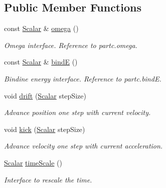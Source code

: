 \subsection*{Public Member Functions}
\begin{DoxyCompactItemize}
\item 
const \mbox{\hyperlink{class_space_h_1_1_regu_system_a6f6c4d4fd030a85621a78b137c0ac889}{Scalar}} \& \mbox{\hyperlink{class_space_h_1_1_regu_system_a94017190fb2ab31159e27fcbfd105c7b}{omega}} ()
\begin{DoxyCompactList}\small\item\em Omega interface. Reference to partc.\+omega. \end{DoxyCompactList}\item 
const \mbox{\hyperlink{class_space_h_1_1_regu_system_a6f6c4d4fd030a85621a78b137c0ac889}{Scalar}} \& \mbox{\hyperlink{class_space_h_1_1_regu_system_a86d3f6978e184f6cdd91a70eda2b5789}{bindE}} ()
\begin{DoxyCompactList}\small\item\em Bindine energy interface. Reference to partc.\+bindE. \end{DoxyCompactList}\item 
void \mbox{\hyperlink{class_space_h_1_1_regu_system_a96230f1b7cda19c0605e1148252ec7ae}{drift}} (\mbox{\hyperlink{class_space_h_1_1_regu_system_a6f6c4d4fd030a85621a78b137c0ac889}{Scalar}} step\+Size)
\begin{DoxyCompactList}\small\item\em Advance position one step with current velocity. \end{DoxyCompactList}\item 
void \mbox{\hyperlink{class_space_h_1_1_regu_system_a6f395fb438f86a8da6fbd1c7c8903cc4}{kick}} (\mbox{\hyperlink{class_space_h_1_1_regu_system_a6f6c4d4fd030a85621a78b137c0ac889}{Scalar}} step\+Size)
\begin{DoxyCompactList}\small\item\em Advance velocity one step with current acceleration. \end{DoxyCompactList}\item 
\mbox{\hyperlink{class_space_h_1_1_regu_system_a6f6c4d4fd030a85621a78b137c0ac889}{Scalar}} \mbox{\hyperlink{class_space_h_1_1_regu_system_a761c0dab5206189ba9e2abd19b1bce4f}{time\+Scale}} ()
\begin{DoxyCompactList}\small\item\em Interface to rescale the time. \end{DoxyCompactList}\end{DoxyCompactItemize}
